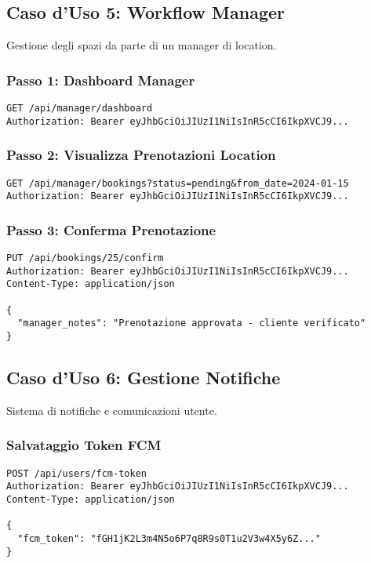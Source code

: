 \subsection{Caso d'Uso 5: Workflow Manager}
Gestione degli spazi da parte di un manager di location.

\subsubsection{Passo 1: Dashboard Manager}
\begin{lstlisting}[style=httpstyle, caption=Dashboard Manager]
GET /api/manager/dashboard
Authorization: Bearer eyJhbGciOiJIUzI1NiIsInR5cCI6IkpXVCJ9...
\end{lstlisting}

\subsubsection{Passo 2: Visualizza Prenotazioni Location}
\begin{lstlisting}[style=httpstyle, caption=Prenotazioni da Gestire]
GET /api/manager/bookings?status=pending&from_date=2024-01-15
Authorization: Bearer eyJhbGciOiJIUzI1NiIsInR5cCI6IkpXVCJ9...
\end{lstlisting}

\subsubsection{Passo 3: Conferma Prenotazione}
\begin{lstlisting}[style=httpstyle, caption=Conferma Prenotazione Manager]
PUT /api/bookings/25/confirm
Authorization: Bearer eyJhbGciOiJIUzI1NiIsInR5cCI6IkpXVCJ9...
Content-Type: application/json

{
  "manager_notes": "Prenotazione approvata - cliente verificato"
}
\end{lstlisting}

\subsection{Caso d'Uso 6: Gestione Notifiche}
Sistema di notifiche e comunicazioni utente.

\subsubsection{Salvataggio Token FCM}
\begin{lstlisting}[style=httpstyle, caption=Registrazione per Notifiche Push]
POST /api/users/fcm-token
Authorization: Bearer eyJhbGciOiJIUzI1NiIsInR5cCI6IkpXVCJ9...
Content-Type: application/json

{
  "fcm_token": "fGH1jK2L3m4N5o6P7q8R9s0T1u2V3w4X5y6Z..."
}
\end{lstlisting}

